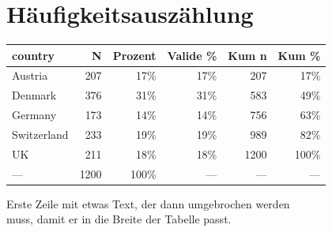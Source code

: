 \documentclass[
  a4paper,
  DIV=11,
  numbers=noendperiod]{scrartcl}
\begin{document}
\section{Häufigkeitsauszählung}\label{huxe4ufigkeitsauszuxe4hlung}

\begin{table}
\fontsize{12.0pt}{14.4pt}\selectfont
\begin{tabular*}{0.8\linewidth}{@{\extracolsep{\fill}}lrrrrr}
\toprule
country & N & Prozent & Valide \% & Kum n & Kum \% \\ 
\midrule\addlinespace[2.5pt]
Austria & 207 & 17\% & 17\% & 207 & 17\% \\ 
Denmark & 376 & 31\% & 31\% & 583 & 49\% \\ 
Germany & 173 & 14\% & 14\% & 756 & 63\% \\ 
Switzerland & 233 & 19\% & 19\% & 989 & 82\% \\ 
UK & 211 & 18\% & 18\% & 1200 & 100\% \\ 
{\textcolor[HTML]{999999}{—}} & {\textcolor[HTML]{999999}{1200}} & {\textcolor[HTML]{999999}{100\%}} & {\textcolor[HTML]{999999}{---}} & {\textcolor[HTML]{999999}{—}} & {\textcolor[HTML]{999999}{---}} \\ 
\bottomrule
\end{tabular*}
\begin{minipage}{\linewidth}
Erste Zeile mit etwas Text, der dann umgebrochen werden\\
muss, damit er in die Breite der Tabelle passt.\\
\end{minipage}
\end{table}
\end{document}
